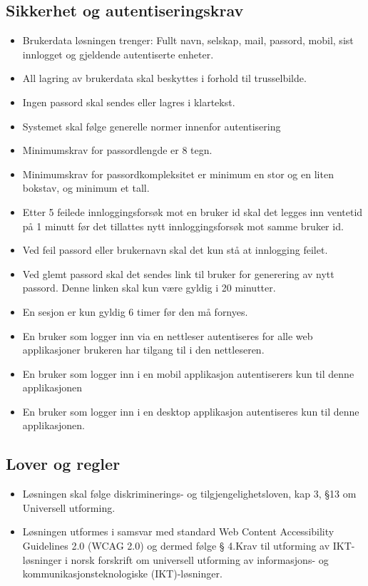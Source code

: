 \subsection{Sikkerhet og autentiseringskrav}
\label{subsec:kravspesifikasjon_operasjonelleKrav_sikkerhet}

\begin{itemize}
\item Brukerdata løsningen trenger: Fullt navn, selskap, mail, passord, mobil, sist innlogget og gjeldende autentiserte enheter. 
\item All lagring av brukerdata skal beskyttes i forhold til trusselbilde. 
\item Ingen passord skal sendes eller lagres i klartekst.
\item Systemet skal følge generelle normer innenfor autentisering
\item Minimumskrav for passordlengde er 8 tegn.
\item Minimumskrav for passordkompleksitet er minimum en stor og en liten bokstav, og minimum et tall. 
\item Etter 5 feilede innloggingsforsøk mot en bruker id skal det legges inn ventetid på 1 minutt før det tillattes nytt innloggingsforsøk mot samme bruker id.
\item Ved feil passord eller brukernavn skal det kun stå at innlogging feilet. 
\item Ved glemt passord skal det sendes link til bruker for generering av nytt passord. Denne linken skal kun være gyldig i 20 minutter.
\item En sesjon er kun gyldig 6 timer før den må fornyes.
\item En bruker som logger inn via en nettleser  autentiseres for alle web applikasjoner brukeren har tilgang til i den nettleseren.
\item En bruker som logger inn i en mobil applikasjon autentiserers kun til denne applikasjonen
\item En bruker som logger inn i en desktop applikasjon autentiseres kun til denne applikasjonen.
\end{itemize}

\subsection{Lover og regler}
\label{subsec:kravspesifikasjon_operasjonelleKrav_loverOgRegler}
\begin{itemize}
\item Løsningen skal følge diskriminerings- og tilgjengelighetsloven, kap 3, §13 om Universell utforming.
\item Løsningen utformes i samsvar med standard Web Content Accessibility Guidelines 2.0 (WCAG 2.0) og dermed følge § 4.Krav til utforming av IKT-løsninger i norsk forskrift om universell utforming av informasjons- og kommunikasjonsteknologiske (IKT)-løsninger. 

\end{itemize}

